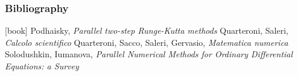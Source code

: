 \documentclass{beamer}
\begin{document}
\begin{frame}
\begin{figure}
\begin{subfigure}{.5\textwidth}
		\end{subfigure}
	\end{figure}
\end{frame}


\begin{frame} %
	\frametitle{Bibliography}
	\begin{thebibliography}{9}
		 Podhaisky, \textit{Parallel two-step Runge-Kutta methods}
		 Quarteroni, Saleri, \textit{Calcolo scientifico}
		 Quarteroni, Sacco, Saleri, Gervasio, \textit{Matematica numerica}
		 Solodushkin, Iumanova, \textit{Parallel Numerical Methods for Ordinary Differential Equations: a Survey}	
	\end{thebibliography}
\end{frame}
\end{document}
